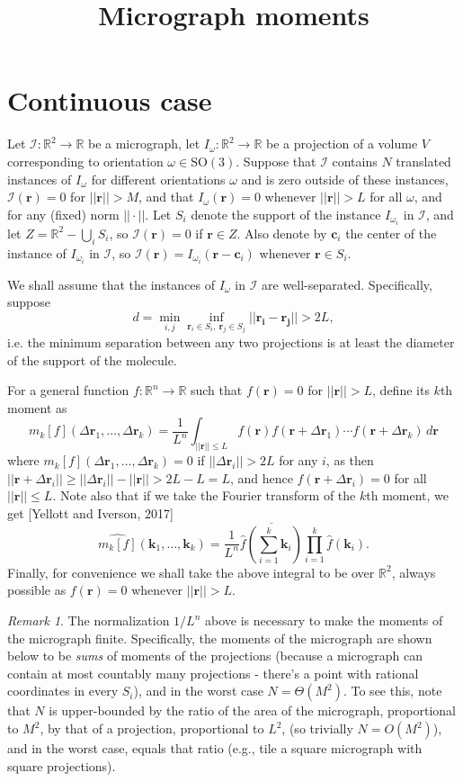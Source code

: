 \documentclass{amsart}
\theoremstyle{definition}
\theoremstyle{remark}
\newtheorem{remark}[theorem]{Remark}
\numberwithin{equation}{section}
\newcommand{\rr}{\mathbf{r}}
\newcommand{\cc}{\mathbf{c}}
\newcommand{\kk}{\mathbf{k}}
\newcommand{\RR}{\mathbb{R}}
\newcommand{\II}{\mathcal{I}}
\begin{document}
\title{Micrograph moments}

\maketitle

\section{Continuous case}
Let $\II:\RR^2\to\RR$ be a micrograph, let $I_{\omega}:\RR^2\to\RR$ be a projection of a volume $V$ corresponding to orientation $\omega\in\text{SO}(3)$. Suppose that $\II$ contains $N$ translated instances of $I_{\omega}$ for different orientations $\omega$ and is zero outside of these instances, $\II(\rr)=0$ for $||\rr|| > M$, and that $I_{\omega}(\rr) = 0$ whenever $||\rr||> L$ for all $\omega$, and for any (fixed) norm $||\cdot||$. Let $S_i$ denote the support of the instance $I_{\omega_i}$ in $\II$, and let $Z = \RR^2-\bigcup_iS_i$, so $\II(\rr)=0$ if $\rr\in Z$. Also denote by $\cc_i$ the center of the instance of $I_{\omega_i}$ in $\II$, so $\II(\rr) = I_{\omega_i}(\rr-\cc_i)$ whenever $\rr\in S_i$. 

We shall assume that the instances of $I_{\omega}$ in $\II$ are well-separated. Specifically, suppose 
\[d = \min_{i,j}\inf_{\rr_i\in S_i,\ \rr_j\in S_j}||\mathbf{r_i}-\mathbf{r_j}|| > 2L,\] 
i.e. the minimum separation between any two projections is at least the diameter of the support of the molecule. 

For a general function $f:\RR^n\to\RR$ such that $f(\rr)=0$ for $||\rr||>L$, define its $k$th moment as
\[ m_k[f](\Delta \rr_1,\ldots, \Delta\rr_k) = \frac{1}{L^n}\int_{||\rr||\leq L}f(\rr)f(\rr+\Delta\rr_1)\cdots f(\rr+\Delta\rr_k)\, d\rr\]
where $m_k[f](\Delta\rr_1,\ldots,\Delta\rr_k) = 0$ if $||\Delta\rr_i|| > 2L$ for any $i$, as then $||\rr+\Delta\rr_i|| \geq ||\Delta\rr_i|| - ||\rr|| > 2L-L = L$, and hence $f(\rr+\Delta\rr_i)=0$ for all $||\rr|| \leq L$. Note also that if we take the Fourier transform of the $k$th moment, we get [Yellott and Iverson, 2017]
\[ \widehat{m_k[f]}(\kk_1,\ldots, \kk_k) = \frac{1}{L^n}\overline{\widehat f\left(\sum_{i=1}^k\kk_i\right)}\prod_{i=1}^k\widehat f(\kk_i).\]
Finally, for convenience we shall take the above integral to be over $\RR^2$, always possible as $f(\rr)=0$ whenever $||\rr||>L$.

\begin{remark} The normalization $1/L^n$ above is necessary to make the moments of the micrograph finite. Specifically, the moments of the micrograph are shown below to be \emph{sums} of moments of the projections (because a micrograph can contain at most countably many projections - there's a point with rational coordinates in every $S_i$), and in the worst case $N=\Theta(M^2)$. To see this, note that $N$ is upper-bounded by the ratio of the area of the micrograph, proportional to $M^2$, by that of a projection, proportional to $L^2$, (so trivially $N=O(M^2)$), and in the worst case, equals that ratio (e.g., tile a square micrograph with square projections). \end{remark}
\end{document}
